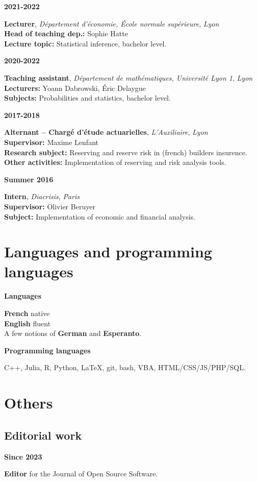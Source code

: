 \documentclass[a4paper,11pt]{article}
\newcommand{\tabcv}[2]{
\begin{minipage}[t]{0.12\linewidth}
\textbf{\footnotesize #1}
\end{minipage}\hfill
\begin{minipage}[t]{0.85\linewidth}
#2
\end{minipage}
\vspace{1em}
}
\newcommand{\bull}[1]{\textbf{#1}}
\begin{document}
\tabcv{2021-2022}{
\textbf{Lecturer}, \textit{Département d'économie, École normale supérieure}, \textit{Lyon}\\[0.5em]
{\footnotesize
  \bull{Head of teaching dep.:} Sophie Hatte\\
  \bull{Lecture topic:} Statistical inference, bachelor level.\\
}
}

\tabcv{2020-2022}{
\textbf{Teaching assistant}, \textit{Département de mathématiques, Université Lyon 1}, \textit{Lyon}\\[0.5em]
{\footnotesize
  \bull{Lecturers:} Yoann Dabrowski, Éric Delaygue\\
  \bull{Subjects:} Probabilities and statistics, bachelor level.\\
}
}

\tabcv{2017-2018}{
\textbf{Alternant -- Chargé d'étude actuarielles}, \textit{L'Auxiliaire}, \textit{Lyon}\\[0.5em]
{\footnotesize
  \bull{Supervisor:} Maxime Lenfant\\
  \bull{Research subject:} Reserving and reserve risk in (french) builders insurence.\\
  \bull{Other activities:} Implementation of reserving and risk analysis tools.\\
}
}


\tabcv{Summer 2016}{
\textbf{Intern}, \textit{Diacrisis}, \textit{Paris}\\[0.5em]
{\footnotesize
  \bull{Supervisor:} Olivier Beruyer\\
  \bull{Subject:} Implementation of economic and financial analysis. \\
}
}

\section{Languages and programming languages}
\tabcv{Languages}{
  \textbf{French} native\\ 
  \textbf{English} fluent\\ 
  A few notions of \textbf{German} and \textbf{Esperanto}.\\
}
\tabcv{Programming languages}{C++, Julia, R, Python, \LaTeX, git, bash, VBA, HTML/CSS/JS/PHP/SQL.}

\section{Others}

\subsection{Editorial work}
\tabcv{Since 2023}{\textbf{Editor} for the {{Journal of Open Source Software}}.}
\end{document}
